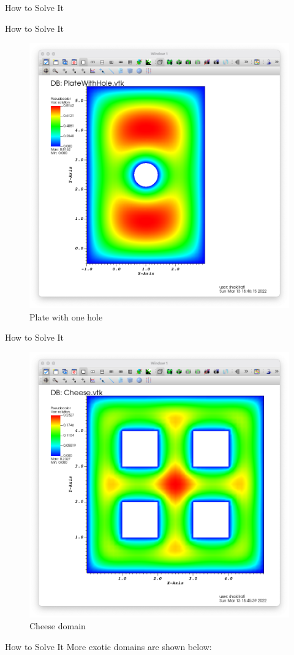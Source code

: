\documentclass{beamer}
\begin{document}
\begin{section}{How to Solve It}
\begin{frame}{How to Solve It}
\begin{figure}
        \includegraphics[scale = 0.2]{PlateWithHole.png}
        \caption{Plate with one hole}
    \end{figure} \quad
\end{frame}
\begin{frame}{How to Solve It}
    \begin{figure}
        \includegraphics[scale = 0.2]{Cheese.png}
        \caption{Cheese domain}
    \end{figure}
\end{frame}
\begin{frame}{How to Solve It}
    More exotic domains are shown below:


\end{frame}
\end{section}
\end{document}

